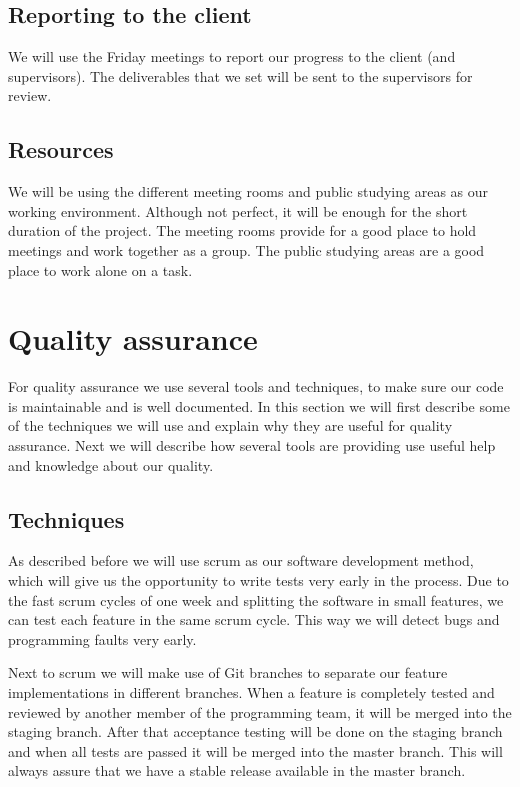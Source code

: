\documentclass[]{article}
\begin{document}
\subsection{Reporting to the client}
We will use the Friday meetings to report our progress to the client (and supervisors).
The deliverables that we set will be sent to the supervisors for review.

\subsection{Resources}
We will be using the different meeting rooms and public studying areas as our working environment.
Although not perfect, it will be enough for the short duration of the project.
The meeting rooms provide for a good place to hold meetings and work together as a group.
The public studying areas are a good place to work alone on a task.

\section{Quality assurance}
For quality assurance we use several tools and techniques, to make sure our code is maintainable and is well documented.
In this section we will first describe some of the techniques we will use and explain why they are useful for quality assurance.
Next we will describe how several tools are providing use useful help and knowledge about our quality.

\subsection{Techniques}
As described before we will use scrum as our software development method, which will give us the opportunity to write tests very early in the process.
Due to the fast scrum cycles of one week and splitting the software in small features, we can test each feature in the same scrum cycle.
This way we will detect bugs and programming faults very early.

Next to scrum we will make use of Git branches to separate our feature implementations in different branches.
When a feature is completely tested and reviewed by another member of the programming team, it will be merged into the staging branch.
After that acceptance testing will be done on the staging branch and when all tests are passed it will be merged into the master branch.
This will always assure that we have a stable release available in the master branch.
\end{document}
